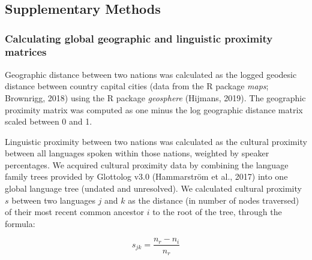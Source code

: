 \documentclass[
  man,floatsintext]{apa6}
\begin{document}
\endgroup

\newpage

\hypertarget{appendix-appendix}{%
\appendix}


\renewcommand{\appendixname}{\bf{Supplementary Material}}
\renewcommand{\figurename}{Supplementary Figure}
\renewcommand{\tablename}{Supplementary Table}
\renewcommand{\thefigure}{S\arabic{figure}} \setcounter{figure}{0}
\renewcommand{\thetable}{S\arabic{table}} \setcounter{table}{0}
\renewcommand{\theequation}{S\arabic{table}} \setcounter{equation}{0}

\hypertarget{section}{%
\section{}\label{section}}

\hypertarget{supplementary-methods}{%
\subsection{Supplementary Methods}\label{supplementary-methods}}

\hypertarget{calculating-global-geographic-and-linguistic-proximity-matrices}{%
\subsubsection{Calculating global geographic and linguistic proximity matrices}\label{calculating-global-geographic-and-linguistic-proximity-matrices}}

Geographic distance between two nations was calculated as the logged geodesic distance between country capital cities (data from the R package \emph{maps}; Brownrigg, 2018) using the R package \emph{geosphere} (Hijmans, 2019). The geographic proximity matrix was computed as one minus the log geographic distance matrix scaled between 0 and 1.

Linguistic proximity between two nations was calculated as the cultural proximity between all languages spoken within those nations, weighted by speaker percentages. We acquired cultural proximity data by combining the language family trees provided by Glottolog v3.0 (Hammarström et al., 2017) into one global language tree (undated and unresolved). We calculated cultural proximity \(s\) between two languages \(j\) and \(k\) as the distance (in number of nodes traversed) of their most recent common ancestor \(i\) to the root of the tree, through the formula:

\[
s_{jk} = \frac{n_{r}-n_{i}}{n_{r}}
\]
\end{document}
